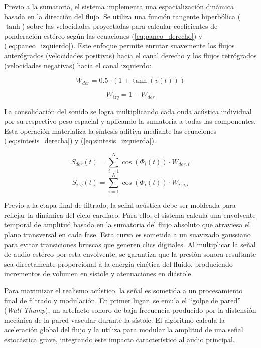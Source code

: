 Previo a la sumatoria, el sistema implementa una espacialización dinámica basada en la dirección del flujo. Se utiliza una función tangente hiperbólica ($\tanh$) sobre las velocidades proyectadas para calcular coeficientes de ponderación estéreo según las ecuaciones (\ref{eq:paneo_derecho}) y (\ref{eq:paneo_izquierdo}). Este enfoque permite enrutar suavemente los flujos anterógrados (velocidades positivas) hacia el canal derecho y los flujos retrógrados (velocidades negativas) hacia el canal izquierdo:

\begin{equation}
    W_{der} = 0.5 \cdot \left(1 + \tanh(v(t))\right) 
    \label{eq:paneo_derecho}
\end{equation}

\begin{equation}
    W_{izq} = 1 - W_{der} 
    \label{eq:paneo_izquierdo}    
\end{equation}

La consolidación del sonido se logra multiplicando cada onda acústica individual por su respectivo peso espacial y aplicando la sumatoria a todas las componentes. Esta operación materializa la síntesis aditiva mediante las ecuaciones (\ref{eq:sintesis_derecha}) y (\ref{eq:sintesis_izquierda}).

\begin{equation}
    S_{der}(t) = \sum_{i=1}^{N} \cos(\Phi_i(t)) \cdot W_{der, i} 
    \label{eq:sintesis_derecha}
\end{equation}
\begin{equation}
    S_{izq}(t) = \sum_{i=1}^{N} \cos(\Phi_i(t)) \cdot W_{izq, i} 
    \label{eq:sintesis_izquierda}
\end{equation}

Previo a la etapa final de filtrado, la señal acústica debe ser moldeada para reflejar la dinámica del ciclo cardíaco. Para ello, el sistema calcula una envolvente temporal de amplitud basada en la sumatoria del flujo absoluto que atraviesa el plano transversal en cada fase. Esta curva es sometida a un suavizado gaussiano para evitar transiciones bruscas que generen clics digitales. Al multiplicar la señal de audio estéreo por esta envolvente, se garantiza que la presión sonora resultante sea directamente proporcional a la energía cinética del fluido, produciendo incrementos de volumen en sístole y atenuaciones en diástole.

Para maximizar el realismo acústico, la señal es sometida a un procesamiento final de filtrado y modulación. En primer lugar, se emula el ``golpe de pared'' (\textit{Wall Thump}), un artefacto sonoro de baja frecuencia producido por la distensión mecánica de la pared vascular durante la sístole. El algoritmo calcula la aceleración global del flujo y la utiliza para modular la amplitud de una señal estocástica grave, integrando este impacto característico al audio principal.

